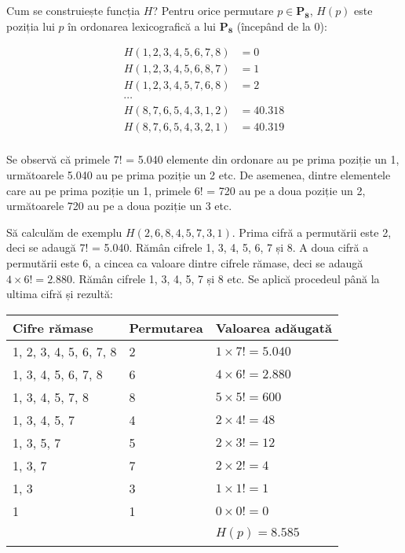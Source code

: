 Cum se construiește funcția $H$? Pentru orice permutare $p \in \mathbf{P_8}$,
$H(p)$ este poziția lui $p$ în ordonarea lexicografică a lui $\mathbf{P_8}$
(începând de la 0):

\begin{align*}
H(1, 2, 3, 4, 5, 6, 7, 8) & = 0 \\
H(1, 2, 3, 4, 5, 6, 8, 7) & = 1 \\
H(1, 2, 3, 4, 5, 7, 6, 8) & = 2 \\
\cdots \\
H(8, 7, 6, 5, 4, 3, 1, 2) & = 40.318 \\
H(8, 7, 6, 5, 4, 3, 2, 1) & = 40.319 \\
\end{align*}

Se observă că primele 7! = 5.040 elemente din ordonare au pe prima poziție un
1, următoarele 5.040 au pe prima poziție un 2 etc. De asemenea, dintre
elementele care au pe prima poziție un 1, primele 6! = 720 au pe a doua
poziție un 2, următoarele 720 au pe a doua poziție un 3 etc.

Să calculăm de exemplu $H(2, 6, 8, 4, 5, 7, 3, 1)$. Prima cifră a permutării
este 2, deci se adaugă 7! = 5.040. Rămân cifrele 1, 3, 4, 5, 6, 7 și 8. A doua
cifră a permutării este 6, a cincea ca valoare dintre cifrele rămase, deci se
adaugă $4 \times 6! = 2.880$. Rămân cifrele 1, 3, 4, 5, 7 și 8 etc. Se aplică
procedeul până la ultima cifră și rezultă:

\begin{table}[H]
  \centering
  \begin{tabular}{|l|l|l|}
    \hline
    Cifre rămase           & Permutarea & Valoarea adăugată \\ \hline
    1, 2, 3, 4, 5, 6, 7, 8 & 2          & $1 \times 7! = 5.040$ \\
    1, 3, 4, 5, 6, 7, 8    & 6          & $4 \times 6! = 2.880$ \\
    1, 3, 4, 5, 7, 8       & 8          & $5 \times 5! = 600$ \\
    1, 3, 4, 5, 7          & 4          & $2 \times 4! = 48$ \\
    1, 3, 5, 7             & 5          & $2 \times 3! = 12$ \\
    1, 3, 7                & 7          & $2 \times 2! = 4$ \\
    1, 3                   & 3          & $1 \times 1! = 1$ \\
    1                      & 1          & $0 \times 0! = 0$ \\ \hline
    \                      &            & $H(p) = 8.585 $\\ \hline
  \end{tabular}
\end{table}

